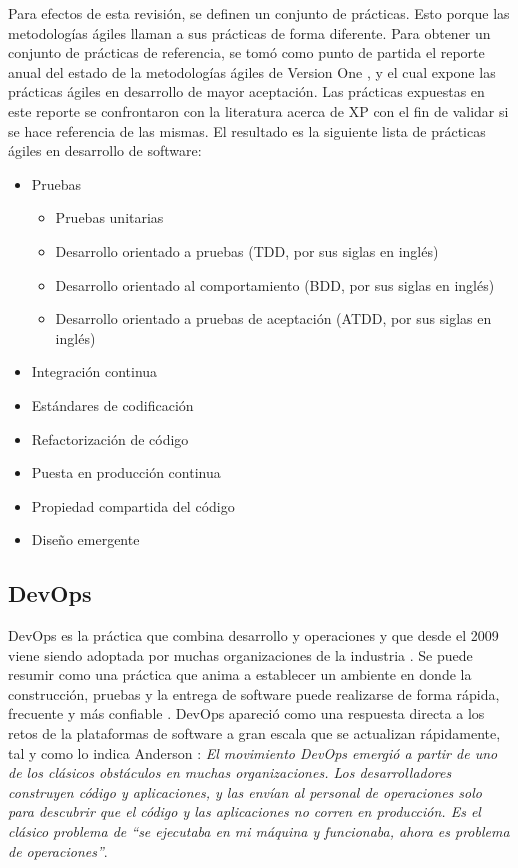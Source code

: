 \documentclass[journal]{IEEEtran}
\begin{document}
Para efectos de esta revisión, se definen un conjunto de prácticas. Esto porque las metodologías ágiles llaman a sus prácticas de forma diferente. Para obtener un conjunto de prácticas de referencia, se tomó como punto de partida el reporte anual del estado de la metodologías ágiles de Version One \cite{version-one}, y el cual expone las prácticas ágiles en desarrollo de mayor aceptación. Las prácticas expuestas en este reporte se confrontaron con la literatura acerca de XP \cite{beck-andres, ford, shore-warden} con el fin de validar si se hace referencia de las mismas. El resultado es la siguiente lista de prácticas ágiles en desarrollo de software:
\begin{itemize}
    \item Pruebas
        \begin{itemize}
            \item Pruebas unitarias
            \item Desarrollo orientado a pruebas (TDD, por sus siglas en inglés)
            \item Desarrollo orientado al comportamiento (BDD, por sus siglas en inglés)
            \item Desarrollo orientado a pruebas de aceptación (ATDD, por sus siglas en inglés)
        \end{itemize}
        \item Integración continua
        \item Estándares de codificación
        \item Refactorización de código
        \item Puesta en producción continua
        \item Propiedad compartida del código
        \item Diseño emergente
\end{itemize}

\subsection{DevOps}
DevOps es la práctica que combina desarrollo y operaciones y que desde el 2009 viene siendo adoptada por muchas organizaciones de la industria \cite{bang-et-al}. Se puede resumir como una práctica que anima a establecer un ambiente en donde la construcción, pruebas y la entrega de software puede realizarse de forma rápida, frecuente y más confiable \cite{henrik-b}. DevOps apareció como una respuesta directa a los retos de la  plataformas de software a gran escala que se actualizan rápidamente, tal y como lo indica Anderson \cite{anderson}: \emph{El movimiento DevOps emergió a partir de uno de los clásicos obstáculos en muchas organizaciones. Los desarrolladores construyen código y aplicaciones, y las envían al personal de operaciones solo para descubrir que el código y las aplicaciones no corren en producción. Es el clásico problema de ``se ejecutaba en mi máquina y funcionaba, ahora es problema de operaciones''}. 
\end{document}
